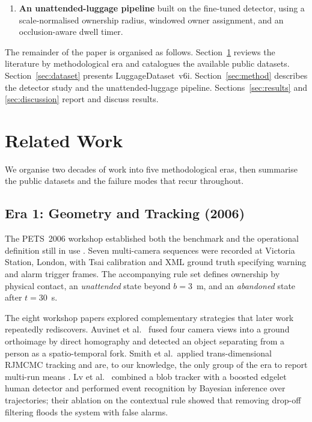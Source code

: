 \documentclass[10pt,twocolumn,a4paper]{article}
\begin{document}
\begin{enumerate}[leftmargin=1.2em,itemsep=2pt,topsep=3pt]
\item \textbf{An unattended-luggage pipeline} built on the fine-tuned detector,
using a scale-normalised ownership radius, windowed owner assignment, and an
occlusion-aware dwell timer.
\end{enumerate}

The remainder of the paper is organised as follows. Section~\ref{sec:related}
reviews the literature by methodological era and catalogues the available public
datasets. Section~\ref{sec:dataset} presents LuggageDataset~v6i.
Section~\ref{sec:method} describes the detector study and the unattended-luggage
pipeline. Sections~\ref{sec:results} and \ref{sec:discussion} report and discuss
results.

\section{Related Work}
\label{sec:related}

\noindent
We organise two decades of work into five methodological eras, then summarise the
public datasets and the failure modes that recur throughout.

\subsection{Era 1: Geometry and Tracking (2006)}

The PETS~2006 workshop established both the benchmark and the operational
definition still in use \cite{pets2006overview}. Seven multi-camera sequences were
recorded at Victoria Station, London, with Tsai calibration and XML ground truth
specifying warning and alarm trigger frames. The accompanying rule set defines
ownership by physical contact, an \emph{unattended} state beyond $b=3$~m, and an
\emph{abandoned} state after $t=30$~s.

The eight workshop papers explored complementary strategies that later work
repeatedly rediscovers. Auvinet et al.\ \cite{auvinet2006} fused four camera views into a ground
orthoimage by direct homography and detected an object separating from a person as
a spatio-temporal fork. Smith et al.\ applied trans-dimensional RJMCMC
tracking and are, to our knowledge, the only group of the era to report multi-run
means \cite{smith2006pets}. Lv et al.\ \cite{lv2006} combined a blob tracker with a boosted
edgelet human detector and performed event recognition by Bayesian inference over
trajectories; their ablation on the contextual rule showed that removing drop-off
filtering floods the system with false alarms.
\end{document}
